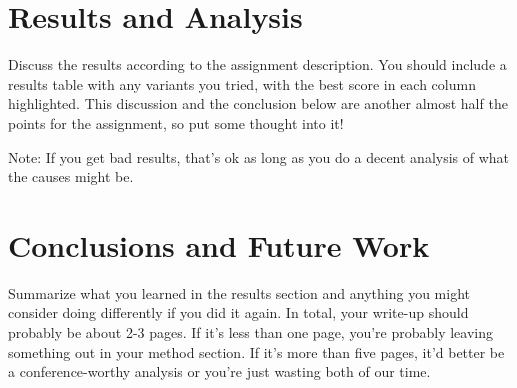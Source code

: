 \documentclass[11pt]{article}
\begin{document}
\section{Results and Analysis}

Discuss the results according to the assignment description. You should include a results table with any variants you tried, with the best score in each column highlighted. This discussion and the conclusion below are another almost half the points for the assignment, so put some thought into it! 

Note: If you get bad results, that's ok as long as you do a decent analysis of what the causes might be. 


\section{Conclusions and Future Work}

Summarize what you learned in the results section and anything you might consider doing differently if you did it again. In total, your write-up should probably be about 2-3 pages. If it's less than one page, you're probably leaving something out in your method section. If it's more than five pages, it'd better be a conference-worthy analysis or you're just wasting both of our time.
\end{document}
